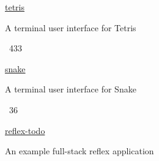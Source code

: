 \vspace{0.25em}
\begin{cvskills}
  \cvskill
    {\href{https://github.com/samtay/tetris}{\color{awesome}tetris}}
    {\begin{cvitems}
        \item A terminal user interface for Tetris
        \item {\color{graytext} \faStarO \, 433}
     \end{cvitems}}
  \cvskill
    {\href{https://github.com/samtay/snake}{\color{awesome}snake}}
    {\begin{cvitems}
        \item A terminal user interface for Snake
        \item {\color{graytext} \faStarO \, 36}
     \end{cvitems}}
  \cvskill
    {\href{https://samtay.github.io/reflex-todo/}{\color{awesome}reflex-todo}}
    {\begin{cvitems}
        \item An example full-stack reflex application
     \end{cvitems}}
\end{cvskills}
